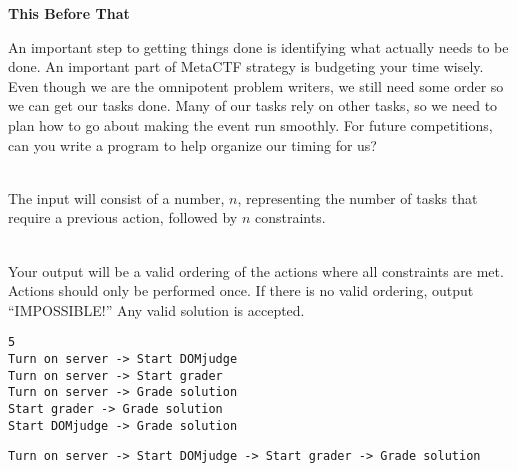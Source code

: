 \documentclass[12pt]{article}
\begin{document}
\begin{center}
   \Large\textbf{This Before That}
\end{center}

An important step to getting things done is identifying what actually needs to be done. An important part of MetaCTF strategy is budgeting your time wisely. Even though we are the omnipotent problem writers, we still need some order so we can get our tasks done. Many of our tasks rely on other tasks, so we need to plan how to go about making the event run smoothly. For future competitions, can you write a program to help organize our timing for us?

\vspace*{.3in} \\

The input will consist of a number, \(n\), representing the number of tasks that require a previous action, followed by \(n\) constraints.

\vspace*{.3in} \\

Your output will be a valid ordering of the actions where all constraints are met. Actions should only be performed once. If there is no valid ordering, output \enquote{IMPOSSIBLE!} Any valid solution is accepted.

\vspace*{.3in} 
\begin{verbatim}
5
Turn on server -> Start DOMjudge
Turn on server -> Start grader
Turn on server -> Grade solution
Start grader -> Grade solution
Start DOMjudge -> Grade solution
\end{verbatim}

\vspace*{.3in} 
\begin{verbatim}
Turn on server -> Start DOMjudge -> Start grader -> Grade solution
\end{verbatim}
\end{document}
